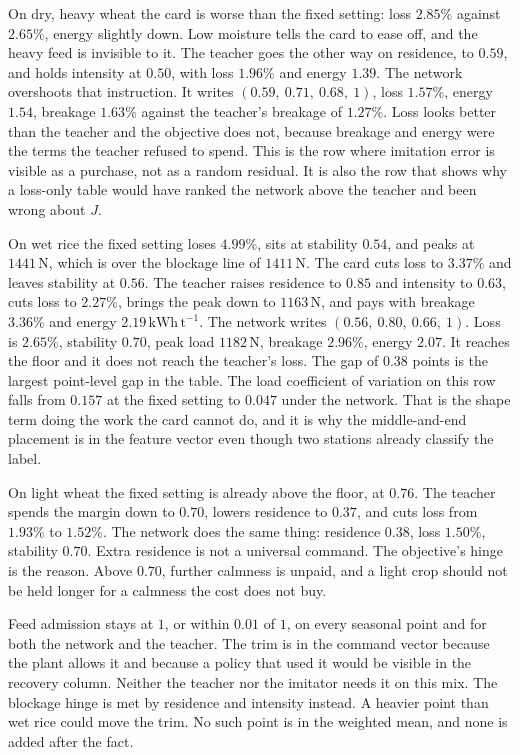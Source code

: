 On dry, heavy wheat the card is worse than the fixed setting: loss \(2.85\%\) against \(2.65\%\), energy slightly down. Low moisture tells the card to ease off, and the heavy feed is invisible to it. The teacher goes the other way on residence, to \(0.59\), and holds intensity at \(0.50\), with loss \(1.96\%\) and energy \(1.39\). The network overshoots that instruction. It writes \((0.59,\ 0.71,\ 0.68,\ 1)\), loss \(1.57\%\), energy \(1.54\), breakage \(1.63\%\) against the teacher's breakage of \(1.27\%\). Loss looks better than the teacher and the objective does not, because breakage and energy were the terms the teacher refused to spend. This is the row where imitation error is visible as a purchase, not as a random residual. It is also the row that shows why a loss-only table would have ranked the network above the teacher and been wrong about \(J\).

On wet rice the fixed setting loses \(4.99\%\), sits at stability \(0.54\), and peaks at \(1441\,\mathrm{N}\), which is over the blockage line of \(1411\,\mathrm{N}\). The card cuts loss to \(3.37\%\) and leaves stability at \(0.56\). The teacher raises residence to \(0.85\) and intensity to \(0.63\), cuts loss to \(2.27\%\), brings the peak down to \(1163\,\mathrm{N}\), and pays with breakage \(3.36\%\) and energy \(2.19\,\mathrm{kWh\,t^{-1}}\). The network writes \((0.56,\ 0.80,\ 0.66,\ 1)\). Loss is \(2.65\%\), stability \(0.70\), peak load \(1182\,\mathrm{N}\), breakage \(2.96\%\), energy \(2.07\). It reaches the floor and it does not reach the teacher's loss. The gap of \(0.38\) points is the largest point-level gap in the table. The load coefficient of variation on this row falls from \(0.157\) at the fixed setting to \(0.047\) under the network. That is the shape term doing the work the card cannot do, and it is why the middle-and-end placement is in the feature vector even though two stations already classify the label.

On light wheat the fixed setting is already above the floor, at \(0.76\). The teacher spends the margin down to \(0.70\), lowers residence to \(0.37\), and cuts loss from \(1.93\%\) to \(1.52\%\). The network does the same thing: residence \(0.38\), loss \(1.50\%\), stability \(0.70\). Extra residence is not a universal command. The objective's hinge is the reason. Above \(0.70\), further calmness is unpaid, and a light crop should not be held longer for a calmness the cost does not buy.

Feed admission stays at \(1\), or within \(0.01\) of \(1\), on every seasonal point and for both the network and the teacher. The trim is in the command vector because the plant allows it and because a policy that used it would be visible in the recovery column. Neither the teacher nor the imitator needs it on this mix. The blockage hinge is met by residence and intensity instead. A heavier point than wet rice could move the trim. No such point is in the weighted mean, and none is added after the fact.

